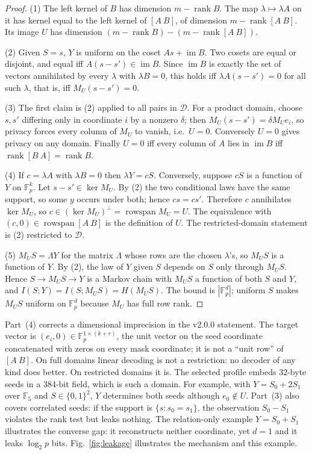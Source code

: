 \documentclass[pdflatex,sn-mathphys-num,twocolumn]{sn-jnl}
\theoremstyle{plain}
\theoremstyle{definition}
\newcommand{\F}{\mathbb{F}}
\newcommand{\rk}{\operatorname{rank}}
\newcommand{\im}{\operatorname{im}}
\begin{document}
\begin{proof}
(1) The left kernel of $B$ has dimension $m-\rk B$. The map $\lambda\mapsto\lambda A$ on it has kernel equal to the left kernel of $[A\ B]$, of dimension $m-\rk[A\ B]$. Its image $U$ has dimension $(m-\rk B)-(m-\rk[A\ B])$.

(2) Given $S=s$, $Y$ is uniform on the coset $As+\im B$. Two cosets are equal or disjoint, and equal iff $A(s-s')\in\im B$. Since $\im B$ is exactly the set of vectors annihilated by every $\lambda$ with $\lambda B=0$, this holds iff $\lambda A(s-s')=0$ for all such $\lambda$, that is, iff $M_U(s-s')=0$.

(3) The first claim is (2) applied to all pairs in $\mathcal D$. For a product domain, choose $s,s'$ differing only in coordinate $i$ by a nonzero $\delta$; then $M_U(s-s')=\delta M_U e_i$, so privacy forces every column of $M_U$ to vanish, i.e.\ $U=0$. Conversely $U=0$ gives privacy on any domain. Finally $U=0$ iff every column of $A$ lies in $\im B$ iff $\rk[B\ A]=\rk B$.

(4) If $c=\lambda A$ with $\lambda B=0$ then $\lambda Y=cS$. Conversely, suppose $cS$ is a function of $Y$ on $\F_p^k$. Let $s-s'\in\ker M_U$. By (2) the two conditional laws have the same support, so some $y$ occurs under both; hence $cs=cs'$. Therefore $c$ annihilates $\ker M_U$, so $c\in(\ker M_U)^\perp=\operatorname{rowspan}M_U=U$. The equivalence with $(c,0)\in\operatorname{rowspan}[A\ B]$ is the definition of $U$. The restricted-domain statement is (2) restricted to $\mathcal D$.

(5) $M_US=\Lambda Y$ for the matrix $\Lambda$ whose rows are the chosen $\lambda$'s, so $M_US$ is a function of $Y$. By (2), the law of $Y$ given $S$ depends on $S$ only through $M_US$. Hence $S\to M_US\to Y$ is a Markov chain with $M_US$ a function of both $S$ and $Y$, and $I(S;Y)=I(S;M_US)=H(M_US)$. The bound is $|\F_p^d|$; uniform $S$ makes $M_US$ uniform on $\F_p^d$ because $M_U$ has full row rank.
\end{proof}

Part~(4) corrects a dimensional imprecision in the v2.0.0 statement. The target vector is $(e_i,0)\in\F_p^{1\times(k+r)}$, the unit vector on the seed coordinate concatenated with zeros on every mask coordinate; it is not a ``unit row'' of $[A\ B]$. On full domains linear decoding is not a restriction: no decoder of any kind does better. On restricted domains it is. The selected profile embeds 32-byte seeds in a 384-bit field, which is such a domain. For example, with $Y=S_0+2S_1$ over $\F_5$ and $S\in\{0,1\}^2$, $Y$ determines both seeds although $e_0\notin U$. Part~(3) also covers correlated seeds: if the support is $\{s:s_0=s_1\}$, the observation $S_0-S_1$ violates the rank test but leaks nothing. The relation-only example $Y=S_0+S_1$ illustrates the converse gap: it reconstructs neither coordinate, yet $d=1$ and it leaks $\log_2p$ bits. Fig.~\ref{fig:leakage} illustrates the mechanism and this example.
\end{document}
